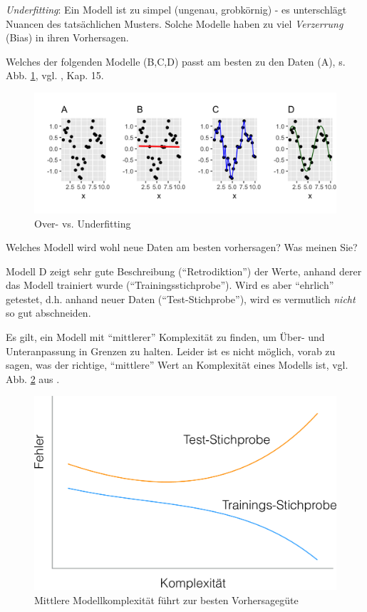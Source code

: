 \documentclass[
]{book}
\begin{document}
\emph{Underfitting}: Ein Modell ist zu simpel (ungenau, grobkörnig) - es unterschlägt Nuancen des tatsächlichen Musters. Solche Modelle haben zu viel \emph{Verzerrung} (Bias) in ihren Vorhersagen.

Welches der folgenden Modelle (B,C,D) passt am besten zu den Daten (A), s. Abb. \ref{fig:overunder}, vgl. \citep{modar}, Kap. 15.

\begin{figure}[H]

{\centering \includegraphics[width=0.7\linewidth]{img/overfitting-4-plots-1} 

}

\caption{Over- vs. Underfitting}\label{fig:overunder}
\end{figure}

Welches Modell wird wohl neue Daten am besten vorhersagen? Was meinen Sie?

Modell D zeigt sehr gute Beschreibung (``Retrodiktion'') der Werte, anhand derer das Modell trainiert wurde (``Trainingsstichprobe'').
Wird es aber ``ehrlich'' getestet, d.h. anhand neuer Daten (``Test-Stichprobe''),
wird es vermutlich \emph{nicht} so gut abschneiden.

Es gilt, ein Modell mit ``mittlerer'' Komplexität zu finden, um Über- und Unteranpassung in Grenzen zu halten.
Leider ist es nicht möglich, vorab zu sagen, was der richtige, ``mittlere'' Wert an Komplexität eines Modells ist, vgl. Abb. \ref{fig:overfitting} aus \citep{modar}.

\begin{figure}[H]

{\centering \includegraphics[width=0.7\linewidth]{img/overfitting-crop} 

}

\caption{Mittlere Modellkomplexität führt zur besten Vorhersagegüte}\label{fig:overfitting}
\end{figure}
\end{document}

